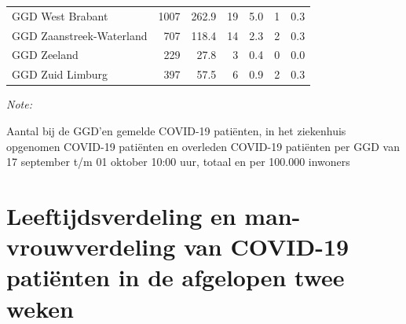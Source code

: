 \documentclass[
  english,
  man,floatsintext]{apa6}
\begin{document}
\begin{table}[H]
\begin{threeparttable}
\begin{tabular}{lrrrrrr}
GGD West Brabant & 1007 & 262.9 & 19 & 5.0 & 1 & 0.3\\
GGD Zaanstreek-Waterland & 707 & 118.4 & 14 & 2.3 & 2 & 0.3\\
GGD Zeeland & 229 & 27.8 & 3 & 0.4 & 0 & 0.0\\
GGD Zuid Limburg & 397 & 57.5 & 6 & 0.9 & 2 & 0.3\\
\bottomrule
\end{tabular}
\begin{tablenotes}
\item \textit{Note: } 
\item Aantal bij de GGD’en gemelde COVID-19 patiënten, in het ziekenhuis opgenomen COVID-19 patiënten en overleden COVID-19 patiënten per GGD van 17 september t/m 01 oktober 10:00 uur, totaal en per 100.000 inwoners
\end{tablenotes}
\end{threeparttable}
\endgroup{}
\end{table}

\newpage

\hypertarget{leeftijdsverdeling-en-man-vrouwverdeling-van-covid-19-patiuxebnten-in-de-afgelopen-twee-weken}{%
\section{Leeftijdsverdeling en man-vrouwverdeling van COVID-19 patiënten in de afgelopen twee weken}\label{leeftijdsverdeling-en-man-vrouwverdeling-van-covid-19-patiuxebnten-in-de-afgelopen-twee-weken}}
\end{document}
